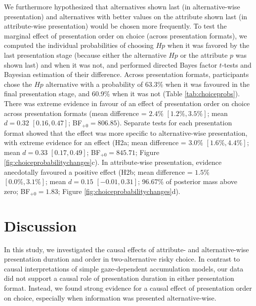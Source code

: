 \documentclass[11pt, a4paper, twocolumn, abstract]{scrartcl}
\begin{document}
We furthermore hypothesized that alternatives shown last (in alternative-wise presentation) and alternatives with better values on the attribute shown last (in attribute-wise presentation) would be chosen more frequently. 
To test the marginal effect of presentation order on choice (across presentation formats), we computed the individual probabilities of choosing $Hp$ when it was favored by the last presentation stage (because either the alternative $Hp$ or the attribute $p$ was shown last) and when it was not, and performed directed Bayes factor $t$-tests and Bayesian estimation of their difference. 
Across presentation formats, participants chose the $Hp$ alternative with a probability of 63.3\% when it was favoured in the final presentation stage, and 60.9\% when it was not (Table \ref{tab:choiceprobs}).
There was extreme evidence in favour of an effect of presentation order on choice across presentation formats (mean difference = $2.4\%$ $[1.2\%, 3.5\%]$; mean $d = 0.32$ $[0.16, 0.47]$; BF$_{{+}0} = 806.85$). 
Separate tests for each presentation format showed that the effect was more specific to alternative-wise presentation, with extreme evidence for an effect (H2a; mean difference = $3.0\%$ $[1.6\%, 4.4\%]$; mean $d = 0.33$ $[0.17, 0.49]$; BF$_{{+}0} = 845.71$; Figure \ref{fig:choiceprobabilitychanges}c). In attribute-wise presentation, evidence anecdotally favoured a positive effect (H2b; mean difference = $1.5\%$ $[0.0\%, 3.1\%]$; mean $d = 0.15$ $[-0.01, 0.31]$; 96.67\% of posterior mass above zero; BF$_{{+}0} = 1.83$; Figure \ref{fig:choiceprobabilitychanges}d).


\section*{Discussion}

In this study, we investigated the causal effects of attribute- and alternative-wise presentation duration and order in two-alternative risky choice. In contrast to causal interpretations of simple gaze-dependent accumulation models, our data did not support a causal role of presentation duration in either presentation format. Instead, we found strong evidence for a causal effect of presentation order on choice, especially when information was presented alternative-wise.

\end{document}
